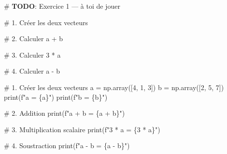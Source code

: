 \documentclass[
  french,
  11pt,
  a4paper,
]{scrbook}
\newenvironment{Shaded}{}{}
\newcommand{\AlertTok}[1]{\textcolor[rgb]{1.00,0.33,0.33}{\textbf{#1}}}
\newcommand{\BuiltInTok}[1]{\textcolor[rgb]{0.84,0.23,0.29}{#1}}
\newcommand{\CommentTok}[1]{\textcolor[rgb]{0.42,0.45,0.49}{#1}}
\newcommand{\DecValTok}[1]{\textcolor[rgb]{0.00,0.36,0.77}{#1}}
\newcommand{\NormalTok}[1]{\textcolor[rgb]{0.14,0.16,0.18}{#1}}
\newcommand{\OperatorTok}[1]{\textcolor[rgb]{0.14,0.16,0.18}{#1}}
\newcommand{\SpecialCharTok}[1]{\textcolor[rgb]{0.00,0.36,0.77}{#1}}
\newcommand{\SpecialStringTok}[1]{\textcolor[rgb]{0.01,0.18,0.38}{#1}}
\begin{document}
\begin{Shaded}
\begin{Highlighting}[]
\CommentTok{\# }\AlertTok{TODO}\CommentTok{: Exercice 1 — à toi de jouer}

\CommentTok{\# 1. Créer les deux vecteurs}


\CommentTok{\# 2. Calculer a + b}


\CommentTok{\# 3. Calculer 3 * a}


\CommentTok{\# 4. Calculer a {-} b}
\end{Highlighting}
\end{Shaded}

\begin{tcolorbox}[enhanced jigsaw, arc=.35mm, bottomrule=.15mm, bottomtitle=1mm, breakable, colback=white, colbacktitle=quarto-callout-tip-color!10!white, colframe=quarto-callout-tip-color-frame, coltitle=black, left=2mm, leftrule=.75mm, opacityback=0, opacitybacktitle=0.6, rightrule=.15mm, title=\textcolor{quarto-callout-tip-color}{\faLightbulb}\hspace{0.5em}{✅ Voir la correction}, titlerule=0mm, toprule=.15mm, toptitle=1mm]

\begin{Shaded}
\begin{Highlighting}[]
\CommentTok{\# 1. Créer les deux vecteurs}
\NormalTok{a }\OperatorTok{=}\NormalTok{ np.array([}\DecValTok{4}\NormalTok{, }\DecValTok{1}\NormalTok{, }\DecValTok{3}\NormalTok{])}
\NormalTok{b }\OperatorTok{=}\NormalTok{ np.array([}\DecValTok{2}\NormalTok{, }\DecValTok{5}\NormalTok{, }\DecValTok{7}\NormalTok{])}
\BuiltInTok{print}\NormalTok{(}\SpecialStringTok{f"a = }\SpecialCharTok{\{}\NormalTok{a}\SpecialCharTok{\}}\SpecialStringTok{"}\NormalTok{)}
\BuiltInTok{print}\NormalTok{(}\SpecialStringTok{f"b = }\SpecialCharTok{\{}\NormalTok{b}\SpecialCharTok{\}}\SpecialStringTok{"}\NormalTok{)}

\CommentTok{\# 2. Addition}
\BuiltInTok{print}\NormalTok{(}\SpecialStringTok{f"a + b = }\SpecialCharTok{\{}\NormalTok{a }\OperatorTok{+}\NormalTok{ b}\SpecialCharTok{\}}\SpecialStringTok{"}\NormalTok{)}

\CommentTok{\# 3. Multiplication scalaire}
\BuiltInTok{print}\NormalTok{(}\SpecialStringTok{f"3 * a = }\SpecialCharTok{\{}\DecValTok{3} \OperatorTok{*}\NormalTok{ a}\SpecialCharTok{\}}\SpecialStringTok{"}\NormalTok{)}

\CommentTok{\# 4. Soustraction}
\BuiltInTok{print}\NormalTok{(}\SpecialStringTok{f"a {-} b = }\SpecialCharTok{\{}\NormalTok{a }\OperatorTok{{-}}\NormalTok{ b}\SpecialCharTok{\}}\SpecialStringTok{"}\NormalTok{)}
\end{Highlighting}
\end{Shaded}


\end{tcolorbox}
\end{document}
